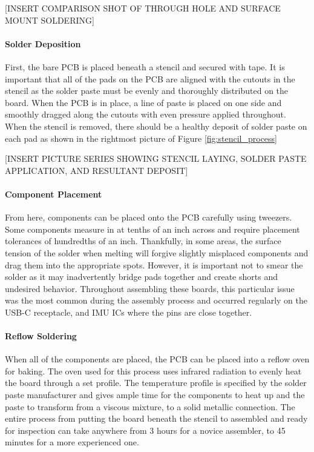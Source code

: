 [INSERT COMPARISON SHOT OF THROUGH HOLE AND SURFACE MOUNT SOLDERING]

\paragraph*{Solder Deposition} First, the bare PCB is placed beneath a stencil and secured with tape.
It is important that all of the pads on the PCB are aligned with the cutouts in the stencil as the solder paste must be evenly and thoroughly distributed on the board.
When the PCB is in place, a line of paste is placed on one side and smoothly dragged along the cutouts with even pressure applied throughout.
When the stencil is removed, there should be a healthy deposit of solder paste on each pad as shown in the rightmost picture of Figure \ref{fig:stencil_process}

[INSERT PICTURE SERIES SHOWING STENCIL LAYING, SOLDER PASTE APPLICATION, AND RESULTANT DEPOSIT]

\paragraph*{Component Placement} From here, components can be placed onto the PCB carefully using tweezers.
Some components measure in at tenths of an inch across and require placement tolerances of hundredths of an inch.
Thankfully, in some areas, the surface tension of the solder when melting will forgive slightly misplaced components and drag them into the appropriate spots.
However, it is important not to smear the solder as it may inadvertently bridge pads together and create shorts and undesired behavior.
Throughout assembling these boards, this particular issue was the most common during the assembly process and occurred regularly on the USB-C receptacle, and IMU ICs where the pins are close together.

\paragraph*{Reflow Soldering} When all of the components are placed, the PCB can be placed into a reflow oven for baking.
The oven used for this process uses infrared radiation to evenly heat the board through a set profile.
The temperature profile is specified by the solder paste manufacturer and gives ample time for the components to heat up and the paste to transform from a viscous mixture, to a solid metallic connection.
The entire process from putting the board beneath the stencil to assembled and ready for inspection can take anywhere from 3 hours for a novice assembler, to 45 minutes for a more experienced one.

